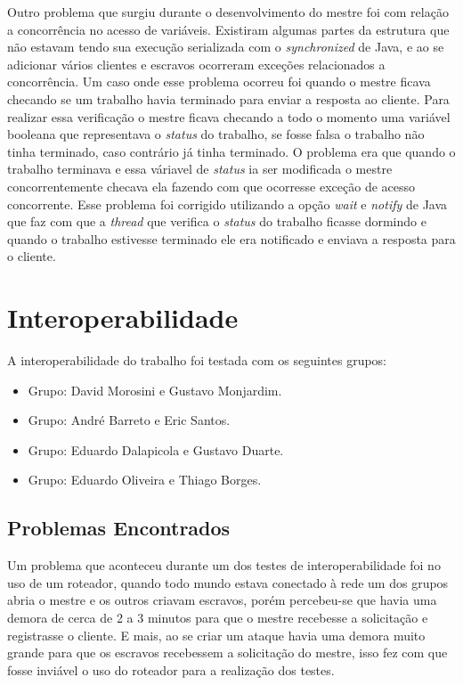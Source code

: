 \documentclass[
	12pt,				%
    oneside,			%
	a4paper,			%
	english,			%
	brazil,				%
	]{abntex2}
\begin{document}
Outro problema que surgiu durante o desenvolvimento do mestre foi com relação a concorrência no acesso de variáveis. Existiram
algumas partes da estrutura que não estavam tendo sua execução serializada com o \textit{synchronized} de Java, e ao se adicionar vários clientes e escravos ocorreram exceções relacionados a concorrência. Um caso onde esse problema ocorreu foi quando o mestre ficava checando se um trabalho havia terminado para enviar a resposta ao cliente. Para realizar essa verificação o mestre ficava checando a todo o momento uma variável booleana que representava o \textit{status} do trabalho, se fosse falsa o trabalho não tinha terminado, caso contrário já tinha terminado. O problema era que quando o trabalho terminava e essa váriavel de \textit{status} ia ser modificada o mestre concorrentemente checava ela fazendo com que ocorresse exceção de acesso concorrente. Esse problema foi corrigido utilizando a opção \textit{wait} e \textit{notify} de Java que faz com que a \textit{thread} que verifica o \textit{status} do trabalho ficasse dormindo e quando o trabalho estivesse terminado ele era notificado e enviava a resposta para o cliente.

\chapter{Interoperabilidade}
A interoperabilidade do trabalho foi testada com os seguintes grupos:

\begin{itemize}

	\item Grupo: David Morosini e Gustavo Monjardim.
	\item Grupo: André Barreto e Eric Santos.
	\item Grupo: Eduardo Dalapicola e Gustavo Duarte.
	\item Grupo: Eduardo Oliveira e Thiago Borges.

\end{itemize}

\section{Problemas Encontrados}

Um problema que aconteceu durante um dos testes de interoperabilidade foi no uso de um roteador, quando todo mundo estava conectado à rede um dos grupos abria o mestre e os outros criavam escravos, porém percebeu-se que havia uma demora de cerca de 2 a 3 minutos para que o mestre recebesse a solicitação e registrasse o cliente. E mais, ao se criar um ataque havia uma demora muito grande para que os escravos recebessem a solicitação do mestre, isso fez com que fosse inviável o uso do roteador para a realização dos testes.
\end{document}
